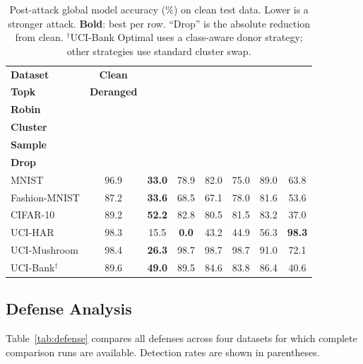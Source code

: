 \documentclass{article}
\begin{document}
\begin{table}[t]
\centering
\caption{Post-attack global model accuracy (\%) on clean test data.
  Lower is a stronger attack. \textbf{Bold}: best per row.
  ``Drop'' is the absolute reduction from clean. $^\dag$UCI-Bank Optimal
  uses a class-aware donor strategy; other strategies use standard
  cluster swap.}
\label{tab:attack_results}
\small
\setlength{\tabcolsep}{3pt}
\begin{tabular}{l c c c c c c c}
\toprule
\textbf{Dataset} & \textbf{Clean}
  & \makecell{\textbf{Opt.}\\\textbf{Topk}}
  & \textbf{Deranged}
  & \makecell{\textbf{Round}\\\textbf{Robin}}
  & \makecell{\textbf{Rnd.}\\\textbf{Cluster}}
  & \makecell{\textbf{Rnd.}\\\textbf{Sample}}
  & \makecell{\textbf{Best}\\\textbf{Drop}} \\
\midrule
MNIST            & 96.9 & \textbf{33.0} & 78.9 & 82.0 & 75.0 & 89.0 & 63.8 \\
Fashion-MNIST    & 87.2 & \textbf{33.6} & 68.5 & 67.1 & 78.0 & 81.6 & 53.6 \\
CIFAR-10         & 89.2 & \textbf{52.2} & 82.8 & 80.5 & 81.5 & 83.2 & 37.0 \\
UCI-HAR          & 98.3 & 15.5 & \textbf{0.0} & 43.2 & 44.9 & 56.3 & \textbf{98.3} \\
UCI-Mushroom     & 98.4 & \textbf{26.3} & 98.7 & 98.7 & 98.7 & 91.0 & 72.1 \\
UCI-Bank$^\dag$  & 89.6 & \textbf{49.0} & 89.5 & 84.6 & 83.8 & 86.4 & 40.6 \\
\bottomrule
\end{tabular}
\end{table}

\subsection{Defense Analysis}
\label{sec:defense_results}

Table~\ref{tab:defense} compares all defenses across four datasets for
which complete comparison runs are available.
Detection rates are shown in parentheses.
\end{document}
